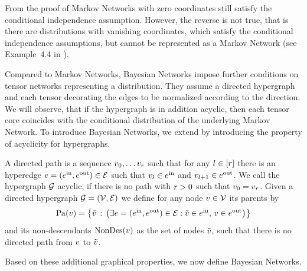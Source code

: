 From the proof of  Markov Networks with zero coordinates still satisfy the conditional independence assumption.
However, the reverse is not true, that is there are distributions with vanishing coordinates, which satisfy the conditional independence assumptions, but cannot be represented as a Markov Network (see Example~4.4 in \cite{koller_probabilistic_2009}).








Compared to Markov Networks, Bayesian Networks impose further conditions on tensor networks representing a distribution.
They assume a directed hypergraph and each tensor decorating the edges to be normalized according to the direction.
We will observe, that if the hypergraph is in addition acyclic, then each tensor core coincides with the conditional distribution of the underlying Markov Network.
To introduce Bayesian Networks, we extend  by introducing the property of acyclicity for hypergraphs.

\begin{definition}
    A directed path is a sequence $v_{0},\ldots v_{r}$ such that for any $l\in[r]$ there is an hyperedge $e=(e^{\mathrm{in}},e^{\mathrm{out}})\in\mathcal{E}$ such that $v_{l}\in e^{\mathrm{in}}$ and $v_{l+1}\in e^{\mathrm{out}}$.
    We call the hypergraph $\mathcal{G}$ acyclic, if there is no path with $r>0$ such that $v_{0}=v_{r}$.
    Given a directed hypergraph $\mathcal{G}=(\mathcal{V},\mathcal{E})$ we define for any node $v\in\mathcal{V}$ its parents by
    \begin{align*}
        \mathrm{Pa}(v) = \left\{\tilde{v}\,:\,\left(
                                                     \exists{e=(e^{\mathrm{in}},e^{\mathrm{out}})\in\mathcal{E}}:{\tilde{v}\in e^{\mathrm{in}},\,v\in e^{\mathrm{out}}}
        \right)\right\}
    \end{align*}
    and its non-descendants $\mathrm{NonDes}(v)$ as the set of nodes $\tilde{v}$, such that there is no directed path from $v$ to $\tilde{v}$.
\end{definition}

Based on these additional graphical properties, we now define Bayesian Networks.

